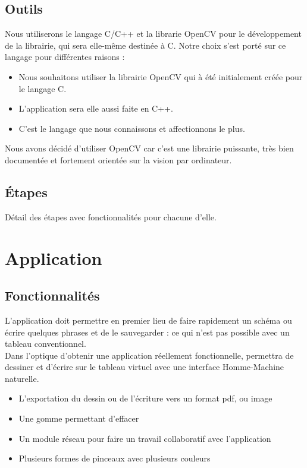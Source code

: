 \documentclass{article}
\begin{document}
		\subsection{Outils}
			Nous utiliserons le langage C/C++ et la librarie OpenCV pour le développement de la librairie, qui sera elle-même destinée à C.
Notre choix s'est porté sur ce langage pour différentes raisons :
		\begin{itemize}
		\item Nous souhaitons utiliser la librairie OpenCV qui à été initialement créée pour le langage C.
		\item L'application sera elle aussi faite en C++.
		\item C'est le langage que nous connaissons et affectionnons le plus.
		\end{itemize}
			Nous avons décidé d'utiliser OpenCV car c'est une librairie puissante, très bien documentée et fortement orientée sur la vision par ordinateur. \\
		\subsection{Étapes}
			Détail des étapes avec fonctionnalités pour chacune d'elle.
	\section{Application}
		\subsection{Fonctionnalités}
		L'application doit permettre en premier lieu de faire rapidement un schéma ou écrire quelques phrases
et de le sauvegarder : ce qui n'est pas possible avec un tableau conventionnel. \\ 			
		Dans l'optique d'obtenir une application réellement fonctionnelle, permettra de dessiner 
et d'écrire sur le tableau virtuel avec une interface Homme-Machine naturelle. \\

		\begin{itemize}
		\item L'exportation du dessin ou de l'écriture vers un format pdf, ou image
		\item Une gomme permettant d'effacer	
		\item Un module réseau pour faire un travail collaboratif avec l'application
		\item Plusieurs formes de pinceaux avec plusieurs couleurs
		\end{itemize}
\end{document}
